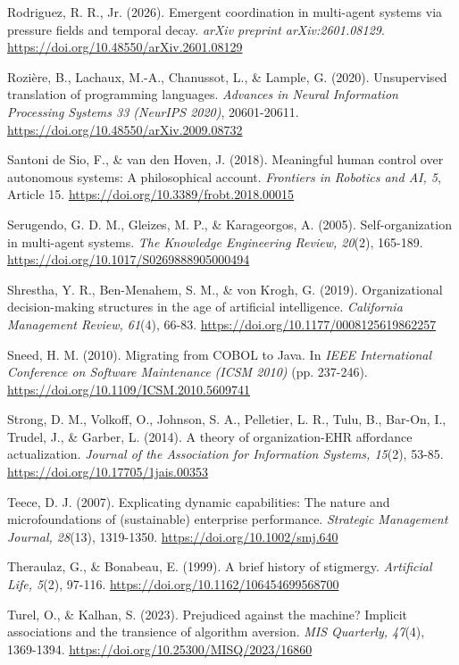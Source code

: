 Rodriguez, R. R., Jr. (2026). Emergent coordination in multi-agent
systems via pressure fields and temporal decay. \emph{arXiv preprint
arXiv:2601.08129}. \url{https://doi.org/10.48550/arXiv.2601.08129}

Rozière, B., Lachaux, M.-A., Chanussot, L., \& Lample, G. (2020).
Unsupervised translation of programming languages. \emph{Advances in
Neural Information Processing Systems 33 (NeurIPS 2020)}, 20601-20611.
\url{https://doi.org/10.48550/arXiv.2009.08732}

Santoni de Sio, F., \& van den Hoven, J. (2018). Meaningful human
control over autonomous systems: A philosophical account.
\emph{Frontiers in Robotics and AI, 5}, Article 15.
\url{https://doi.org/10.3389/frobt.2018.00015}

Serugendo, G. D. M., Gleizes, M. P., \& Karageorgos, A. (2005).
Self-organization in multi-agent systems. \emph{The Knowledge
Engineering Review, 20}(2), 165-189.
\url{https://doi.org/10.1017/S0269888905000494}

Shrestha, Y. R., Ben-Menahem, S. M., \& von Krogh, G. (2019).
Organizational decision-making structures in the age of artificial
intelligence. \emph{California Management Review, 61}(4), 66-83.
\url{https://doi.org/10.1177/0008125619862257}

Sneed, H. M. (2010). Migrating from COBOL to Java. In \emph{IEEE
International Conference on Software Maintenance (ICSM 2010)} (pp.
237-246). \url{https://doi.org/10.1109/ICSM.2010.5609741}

Strong, D. M., Volkoff, O., Johnson, S. A., Pelletier, L. R., Tulu, B.,
Bar-On, I., Trudel, J., \& Garber, L. (2014). A theory of
organization-EHR affordance actualization. \emph{Journal of the
Association for Information Systems, 15}(2), 53-85.
\url{https://doi.org/10.17705/1jais.00353}

Teece, D. J. (2007). Explicating dynamic capabilities: The nature and
microfoundations of (sustainable) enterprise performance.
\emph{Strategic Management Journal, 28}(13), 1319-1350.
\url{https://doi.org/10.1002/smj.640}

Theraulaz, G., \& Bonabeau, E. (1999). A brief history of stigmergy.
\emph{Artificial Life, 5}(2), 97-116.
\url{https://doi.org/10.1162/106454699568700}

Turel, O., \& Kalhan, S. (2023). Prejudiced against the machine?
Implicit associations and the transience of algorithm aversion.
\emph{MIS Quarterly, 47}(4), 1369-1394.
\url{https://doi.org/10.25300/MISQ/2023/16860}

